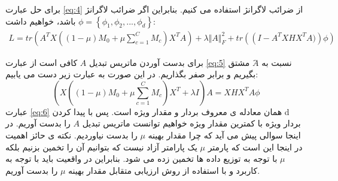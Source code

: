 {{{ 		    برای حل عبارت 
 		    \ref{eq:4}
 		    از ضرائب لاگرانژ استفاده می کنیم. بنابراین اگر ضرائب لاگرانژ 
 		    $\phi = \left\lbrace \phi_1, \phi_2, ... , \phi_d \right\rbrace  $
 		    باشد، خواهیم داشت: 
 		    \begin{equation}
 		    	\begin{aligned}
 		    	L = tr \left( A^{T}X \left( \left( 1 - \mu \right) M_{0} + \mu \sum _{c=1\mathrm{ }}^{C}M_{c} \right) X^{T}A \right) + \lambda \Vert A \Vert_{F}^{2} + tr \left( \left( I -  A^{T}XHX^{T}A)\right) \phi \right) 
 		    	\label{eq:5}
 		    	\end{aligned}
 		    \end{equation}
 		    
 		    برای بدست آوردن ماتریس تبدیل $A$ کافی است از عبارت
 		    \ref{eq:5}
 		    نسبت به $َA$ مشتق بگیریم و برابر صفر بگذاریم. در این صورت به عبارت زیر دست می یابیم:
 		    \begin{equation}
 		    	\left( X \left( \left( 1 - \mu \right) M_{0} + \mu \sum _{c=1\mathrm{ }}^{C}M_{c} \right) X^{T} + \lambda I \right) A = XHX^{T}A \phi
 		    	\label{eq:6}
 		    \end{equation}
 		 	عبارت 
 		 	\ref{eq:6}
 		 	همان معادله ی معروف بردار و مقدار ویژه است. پس با پیدا کردن d بردار ویژه با کمترین مقدار ویژه خواهیم توانست ماتریس تبدیل $A$ را بدست آوریم. در اینجا سوالی پیش می آید که چرا مقدار بهینه
 		 	$\mu$
 		 	 را بدست نیاوردیم. نکته ی حائز اهمیت در اینجا این است که پارمتر 
 		 	$\mu$
 		 	 یک پارامتر آزاد نیست که بتوانیم آن را تخمین بزنیم بلکه 
 		 	$\mu$
 		 	 با توجه به توزیع داده ها تخمین زده می شود. بنابراین در واقعیت باید با توجه به کاربرد و با استفاده از روش ارزیابی متقابل مقدار بهینه 
 		 	$\mu$
 		 	 را بدست آوریم.
 	}
}}
